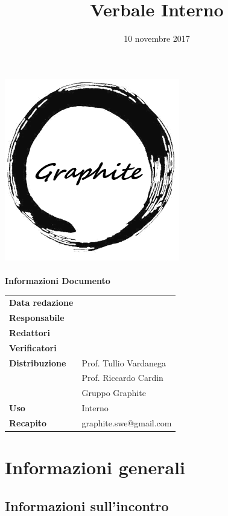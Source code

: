 \documentclass[openany,12pt,a4paper]{article}
\title{Verbale Interno}
\author{}
\date{10 novembre 2017}
\begin{document}
	\makeatletter
	\begin{titlepage}
		\setlength{\headsep}{0pt}  
		\begin{center}
			\includegraphics[width=0.5\linewidth]{Logo.png}\\[1em]
			{\huge \bfseries  \@title }\\[10ex]
			\textbf{\Large Informazioni Documento} \\[2em]
			\bgroup
			\def\arraystretch{1.5}
			\begin{tabular}{l|l}
				\textbf{Data redazione} & \large \@date \\
				\textbf{Responsabile} &  \\
				\textbf{Redattori} &  \\
				\textbf{Verificatori} &  \\
				\textbf{Distribuzione} & Prof. Tullio Vardanega \\
				 & Prof. Riccardo Cardin \\
				 & Gruppo Graphite \\
				\textbf{Uso} & Interno \\
				\textbf{Recapito} & graphite.swe@gmail.com \\
			\end{tabular}
		\egroup
		\end{center}
	\end{titlepage}
	\makeatother

	\thispagestyle{empty}
	\newpage
	
	\section{Informazioni generali}
	
	\subsection{Informazioni sull'incontro}
	
\end{document}
